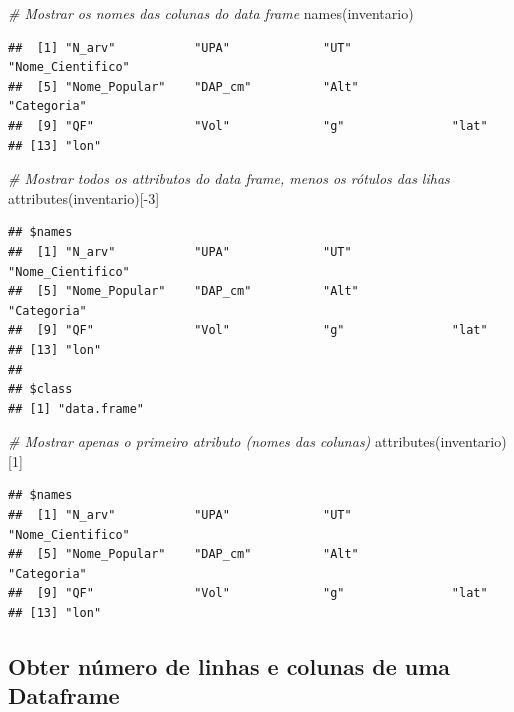 \documentclass[
]{article}
\newenvironment{Shaded}{\begin{snugshade}}{\end{snugshade}}
\newcommand{\CommentTok}[1]{\textcolor[rgb]{0.56,0.35,0.01}{\textit{#1}}}
\newcommand{\DecValTok}[1]{\textcolor[rgb]{0.00,0.00,0.81}{#1}}
\newcommand{\FunctionTok}[1]{\textcolor[rgb]{0.00,0.00,0.00}{#1}}
\newcommand{\NormalTok}[1]{#1}
\newcommand{\SpecialCharTok}[1]{\textcolor[rgb]{0.00,0.00,0.00}{#1}}
\begin{document}
\begin{Shaded}
\begin{Highlighting}[]
\CommentTok{\# Mostrar os nomes das colunas do data frame}
\FunctionTok{names}\NormalTok{(inventario)}
\end{Highlighting}
\end{Shaded}

\begin{verbatim}
##  [1] "N_arv"           "UPA"             "UT"              "Nome_Cientifico"
##  [5] "Nome_Popular"    "DAP_cm"          "Alt"             "Categoria"      
##  [9] "QF"              "Vol"             "g"               "lat"            
## [13] "lon"
\end{verbatim}

\begin{Shaded}
\begin{Highlighting}[]
\CommentTok{\# Mostrar todos os attributos do data frame, menos os rótulos das lihas}
\FunctionTok{attributes}\NormalTok{(inventario)[}\SpecialCharTok{{-}}\DecValTok{3}\NormalTok{]}
\end{Highlighting}
\end{Shaded}

\begin{verbatim}
## $names
##  [1] "N_arv"           "UPA"             "UT"              "Nome_Cientifico"
##  [5] "Nome_Popular"    "DAP_cm"          "Alt"             "Categoria"      
##  [9] "QF"              "Vol"             "g"               "lat"            
## [13] "lon"            
## 
## $class
## [1] "data.frame"
\end{verbatim}

\begin{Shaded}
\begin{Highlighting}[]
\CommentTok{\# Mostrar apenas o primeiro atributo (nomes das colunas)}
\FunctionTok{attributes}\NormalTok{(inventario)[}\DecValTok{1}\NormalTok{]}
\end{Highlighting}
\end{Shaded}

\begin{verbatim}
## $names
##  [1] "N_arv"           "UPA"             "UT"              "Nome_Cientifico"
##  [5] "Nome_Popular"    "DAP_cm"          "Alt"             "Categoria"      
##  [9] "QF"              "Vol"             "g"               "lat"            
## [13] "lon"
\end{verbatim}

\hypertarget{obter-nuxfamero-de-linhas-e-colunas-de-uma-dataframe}{%
\subsection{Obter número de linhas e colunas de uma
Dataframe}\label{obter-nuxfamero-de-linhas-e-colunas-de-uma-dataframe}}
\end{document}
